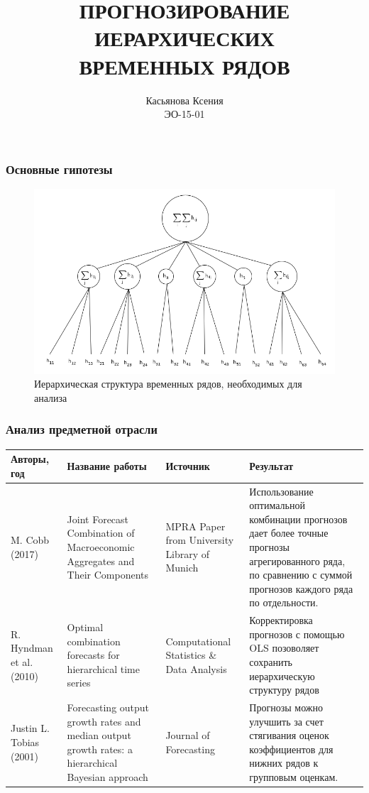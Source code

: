 \documentclass[c, dvipsnames]{beamer}  %
\title[Прогнозирование иерархических рядов ]{ПРОГНОЗИРОВАНИЕ ИЕРАРХИЧЕСКИХ  \\
	ВРЕМЕННЫХ РЯДОВ}
\author[Касьянова Ксения]{Касьянова Ксения \\ \smallskip \scriptsize ЭО-15-01 }
\institute[РАНХиГС]{ \uppercase{
  Российская Академия Народного Хозяйства и  \\ Государственной Службы при Президенте Российской Федерации}}
\date{}
\begin{document}
\frame[plain]{\titlepage}	%


\begin{frame}[shrink=5]
\frametitle{Основные гипотезы} 


\begin{figure}
	\centering
	\includegraphics[width=0.8\linewidth]{Screenshot51}
	\caption{Иерархическая структура временных рядов, необходимых для анализа}
	\label{fig:screenshot51}
\end{figure}



\end{frame}

\begin{frame}[shrink=5]
\frametitle{Анализ предметной отрасли} 


	
	\begin{table} \small\centering\setlength{\extrarowheight}{0.25em}
		
		\begin{tabular}{   >{\centering\footnotesize}p{5.5em} 
				>{\centering\footnotesize}p{8em}
				>{\centering\footnotesize}p{5.5em} 
				>{\centering\footnotesize\arraybackslash}p{12em} }\hline
			
			
			
			Авторы, год & Название работы & Источник & Результат \\\hline 
			M. Cobb (2017) & Joint Forecast Combination of Macroeconomic Aggregates and Their Components  & MPRA Paper from University Library of Munich & Использование оптимальной комбинации прогнозов дает более точные прогнозы агрегированного ряда, по сравнению с суммой прогнозов каждого ряда по отдельности. \\
			R. Hyndman et al. (2010) & Optimal combination forecasts for hierarchical time series  & Computational Statistics \& Data Analysis & Корректировка прогнозов с помощью OLS  позоволяет сохранить иерархическую структуру рядов \\
			Justin L. Tobias (2001) & Forecasting output growth rates and median output growth rates: a hierarchical Bayesian approach  & Journal of Forecasting & Прогнозы можно улучшить за счет  стягивания оценок коэффициентов для нижних рядов к групповым оценкам.\\\hline
		\end{tabular}
	\end{table}


\end{frame}
\end{document}
